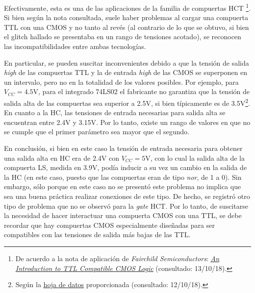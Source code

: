 \documentclass[../../e3_tp2_main.tex]{subfiles}
\begin{document}
Efectivamente, esta es una de las aplicaciones de la familia de compuertas HCT \footnote{De acuerdo a la nota de aplicaci\'on de \textit{Fairchild Semiconductors}: \href{https://www.fairchildsemi.com/application-notes/AN/AN-368.pdf}{\underline{\textit{An Introduction to TTL Compatible CMOS Logic}}} (consultado: 13/10/18).}. Si bien seg\'un la nota consultada, suele haber problemas al cargar una compuerta TTL con una CMOS y no tanto al rev\'es (al contrario de lo que se obtuvo, si bien el glitch hallado se presentaba en un rango de tensiones acotado), se reconocen las incompatibilidades entre ambas tecnolog\'ias.\par

En particular, se pueden suscitar inconvenientes debido a que la tensi\'on de salida \textit{high} de las compuertas TTL y la de entrada \textit{high} de las CMOS se superponen en un intervalo, pero no en la totalidad de los valores posibles. Por ejemplo, para $V_{CC}=4.5\mathrm{V}$, para el integrado 74LS02 el fabricante no garantiza que la tensi\'on de salida alta de las compuertas sea superior a 2.5V, si bien t\'ipicamente es de 3.5V\footnote{Seg\'un la \href{http://www.learn-c.com/74ls02.pdf}{\underline{hoja de datos}} proporcionada (consultado: 12/10/18).}. En cuanto a la HC, las tensiones de entrada necesarias para salida alta se encuentran entre 2.4V y 3.15V. Por lo tanto, existe un rango de valores en que no se cumple que el primer par\'ametro sea mayor que el segundo.\par

En conclusi\'on, si bien en este caso la tensi\'on de entrada necesaria para obtener una salida alta en HC era de 2.4V con $V_{CC}=5\mathrm{V}$, con lo cual la salida alta de la compuerta LS, medida en $3.9\mathrm{V}$, pod\'ia inducir a su vez un cambio en la salida de la HC (en este caso, puesto que las compuertas eran de tipo \textit{nor}, de 1 a 0). Sin embargo, s\'olo porque en este caso no se present\'o este problema no implica que sea una buena pr\'actica realizar conexiones de este tipo. De hecho, se registr\'o otro tipo de problema que no se observ\'o para la \textit{gate} HCT. Por lo tanto, de suscitarse la necesidad de hacer interactuar una compuerta CMOS con una TTL, se debe recordar que hay compuertas CMOS especialmente dise\~nadas para ser compatibles con las tensiones de salida m\'as bajas de las TTL.
\end{document}
